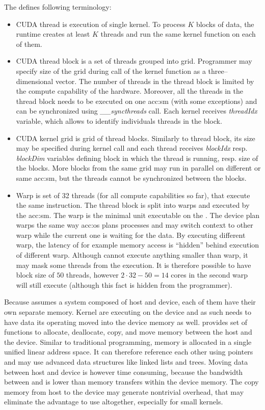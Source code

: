 The \cuda defines following terminology:
\begin{itemize}
    \item CUDA thread is execution of single kernel. To process $K$ blocks of data, the runtime creates at least $K$ threads and run the same kernel function on each of them.
    \item CUDA thread block is a set of threads grouped into grid. Programmer may specify size of the grid during call of the kernel function as a three--dimensional vector. The number of threads in the thread block is limited by the compute capability of the hardware. Moreover, all the threads in the thread block needs to be executed on one \acrshort{acc:sm} (with some exceptions) and can be synchronized using \textit{\_\_syncthreads} call. Each kernel receives \textit{threadIdx} variable, which allows to identify individuals threads in the block.
    \item CUDA kernel grid is grid of thread blocks. Similarly to thread block, its size may be specified during  kernel call and each thread receives \textit{blockIdx} resp. \textit{blockDim} variables defining block in which the thread is running, resp. size of the blocks. More blocks from the same grid may run in parallel on different or same \acrshort{acc:sm}, but the threads cannot be synchronized between the blocks.
    \item Warp is set of 32 threads (for all compute capabilities so far), that execute the same instruction. The thread block is split into warps and executed by the \acrshort{acc:sm}. The warp is the minimal unit executable on the \gpu. The device plan warps the same way \acrshort{acc:os} plans processes and may switch context to other warp while the current one is waiting for the data. By executing different warp, the latency of for example memory access is \enquote{hidden} behind execution of different warp. Although \gpu cannot execute anything smaller than warp, it may mask some threads from the execution. It is therefore possible to have block size of $50$ threads, however $2\cdot32 - 50=14$ cores in the second warp will still execute (although this fact is hidden from the programmer).
\end{itemize}

Because \cuda assumes a system composed of host and device, each of them have their own separate memory. Kernel are executing on the device and as such needs to have data its operating moved into the device memory as well. \cuda provides set of functions to allocate, deallocate, copy, and move memory between the host and the device. Similar to traditional \cpp programming, \cuda memory is allocated in a single unified linear address space. It can therefore reference each other using pointers and may use advanced data structures like linked lists and trees. Moving data between host and device is however time consuming, because the bandwidth between \cpu and \gpu is lower than memory transfers within the device memory. The copy memory from host to the device may generate nontrivial overhead, that may eliminate the advantage to use \gpu altogether, especially for small kernels. 

